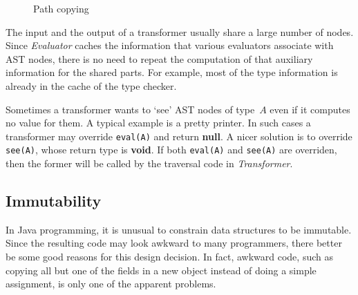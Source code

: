 \documentclass[a4paper]{article}
\newcommand{\jmlCode}{\lstinline[style=jml,basicstyle=\normalsize]}
\theoremstyle{slanted}
\theoremstyle{definition}
\theoremstyle{remark}
\begin{document}
\begin{figure}\centering
{}
\caption{Path copying}\label{fig:path-copying}
\end{figure}

The input and the output of a transformer usually share a large
number of nodes. Since \textit{Evaluator} caches the information
that various evaluators associate with AST nodes, there is no
need to repeat the computation of that auxiliary information for
the shared parts. For example, most of the type information is
already in the cache of the type checker.

Sometimes a transformer wants to `see' AST nodes of type~$A$
even if it computes no value for them. A typical example is
a pretty printer. In such cases a transformer may override
\jmlCode|eval(A)| and return \textbf{null}. A nicer solution is
to override \jmlCode|see(A)|, whose return type is \textbf{void}.
If both \jmlCode|eval(A)| and \jmlCode|see(A)| are overriden,
then the former will be called by the traversal code in
\textit{Transformer}.


\subsection{Immutability}
\label{sec:design.immutability}

In Java programming, it is unusual to constrain data structures
to be immutable. Since the resulting code may look awkward to
many programmers, there better be some good reasons for this
design decision. In fact, awkward code, such as copying all but
one of the fields in a new object instead of doing a simple
assignment, is only one of the apparent problems.
\end{document}
